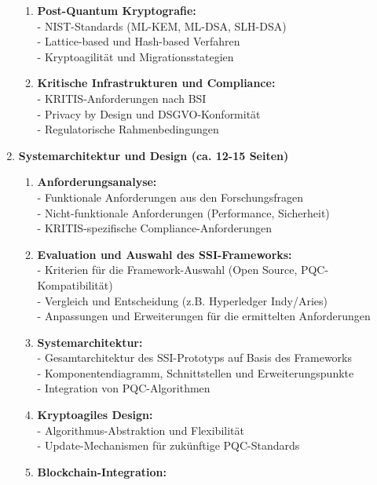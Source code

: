 \begin{enumerate}[label=\textbf{\arabic*.}]
\begin{enumerate}[label=\textbf{2.\arabic*}]
        \item \textbf{Post-Quantum Kryptografie:} \\
        - NIST-Standards (ML-KEM, ML-DSA, SLH-DSA) \\
        - Lattice-based und Hash-based Verfahren \\
        - Kryptoagilität und Migrationsstategien
        \item \textbf{Kritische Infrastrukturen und Compliance:} \\
        - \ac{KRITIS}-Anforderungen nach \ac{BSI} \\
        - Privacy by Design und DSGVO-Konformität \\
        - Regulatorische Rahmenbedingungen
    \end{enumerate}
    \item \textbf{Systemarchitektur und Design (ca. 12-15 Seiten)}
    \begin{enumerate}[label=\textbf{3.\arabic*}]
        \item \textbf{Anforderungsanalyse:} \\
        - Funktionale Anforderungen aus den Forschungsfragen \\
        - Nicht-funktionale Anforderungen (Performance, Sicherheit) \\
        - \ac{KRITIS}-spezifische Compliance-Anforderungen
        \item \textbf{Evaluation und Auswahl des \ac{SSI}-Frameworks:} \\
        - Kriterien für die Framework-Auswahl (Open Source, PQC-Kompatibilität) \\
        - Vergleich und Entscheidung (z.B. Hyperledger Indy/Aries) \\
        - Anpassungen und Erweiterungen für die ermittelten Anforderungen
        \item \textbf{Systemarchitektur:} \\
        - Gesamtarchitektur des \ac{SSI}-Prototyps auf Basis des Frameworks \\
        - Komponentendiagramm, Schnittstellen und Erweiterungspunkte\\
        - Integration von \ac{PQC}-Algorithmen
        \item \textbf{Kryptoagiles Design:} \\
        - Algorithmus-Abstraktion und Flexibilität \\
        - Update-Mechanismen für zukünftige \ac{PQC}-Standards
        \item \textbf{Blockchain-Integration:} \\

\end{enumerate}
\end{enumerate}

